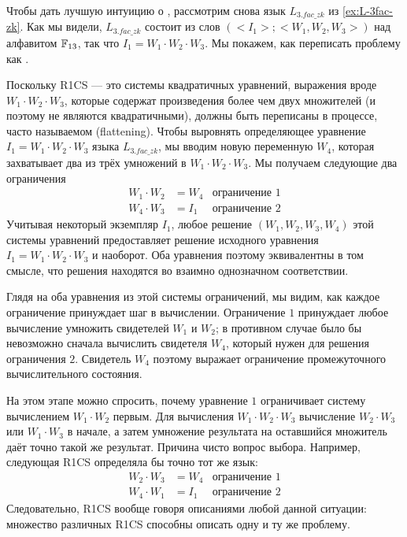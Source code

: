 \begin{example}\label{ex:3-factorization-r1cs} Чтобы дать лучшую интуицию о , рассмотрим снова язык $L_{3.fac\_zk}$ из \examplename{} \ref{ex:L-3fac-zk}. Как мы видели, $L_{3.fac\_zk}$ состоит из слов $(<I_1>;<W_1,W_2,W_3>)$ над алфавитом $\mathbb{F}_{13}$, так что $I_1 = W_1\cdot W_2\cdot W_3$. Мы покажем, как переписать проблему как .

Поскольку R1CS — это системы квадратичных уравнений, выражения вроде $W_1\cdot W_2\cdot W_3$, которые содержат произведения более чем двух множителей (и поэтому не являются квадратичными), должны быть переписаны в процессе, часто называемом  (flattening). Чтобы выровнять определяющее уравнение $I_1 = W_1\cdot W_2\cdot W_3$ языка $L_{3.fac\_zk}$, мы вводим новую переменную $W_4$, которая захватывает два из трёх умножений в $W_1\cdot W_2\cdot W_3$. Мы получаем следующие два ограничения
\begin{align*}
W_1 \cdot W_2 & = W_4 & \text{ограничение } 1 \\
W_4 \cdot W_3 & = I_1 & \text{ограничение } 2
\end{align*}
Учитывая некоторый экземпляр $I_1$, любое решение $(W_1,W_2,W_3,W_4)$ этой системы уравнений предоставляет решение исходного уравнения $I_1 = W_1\cdot W_2\cdot W_3$ и наоборот. Оба уравнения поэтому эквивалентны в том смысле, что решения находятся во взаимно однозначном соответствии.

Глядя на оба уравнения из этой системы ограничений, мы видим, как каждое ограничение принуждает шаг в вычислении. Ограничение $1$ принуждает любое вычисление умножить свидетелей $W_1$ и $W_2$; в противном случае было бы невозможно сначала вычислить свидетеля $W_4$, который нужен для решения ограничения $2$. Свидетель $W_4$ поэтому выражает ограничение промежуточного вычислительного состояния.

На этом этапе можно спросить, почему уравнение $1$ ограничивает систему вычислением $W_1\cdot W_2$ первым. Для вычисления $W_1\cdot W_2 \cdot W_3$ вычисление $W_2\cdot W_3$ или $W_1\cdot W_3$ в начале, а затем умножение результата на оставшийся множитель даёт точно такой же результат. Причина чисто вопрос выбора. Например, следующая R1CS определяла бы точно тот же язык:
\begin{align*}
W_2 \cdot W_3 & = W_4 & \text{ограничение } 1 \\
W_4 \cdot W_1 & = I_1 & \text{ограничение } 2 
\end{align*}
Следовательно, R1CS вообще говоря  описаниями любой данной ситуации: множество различных R1CS способны описать одну и ту же проблему.


\end{example}
